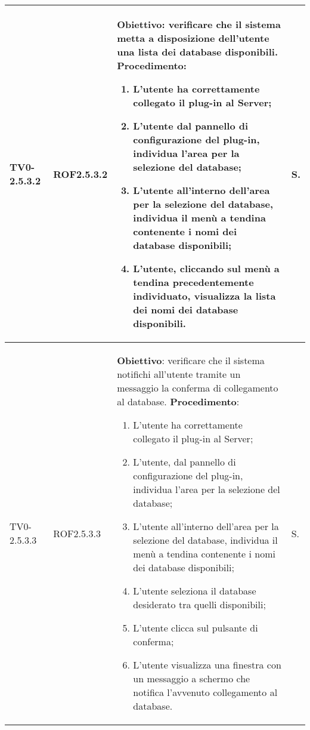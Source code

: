 \begin{longtable}{|C{.15\textwidth}|C{.13\textwidth}|m{.65\textwidth}|C{.08\textwidth}|}
TV0-2.5.3.2 & ROF2.5.3.2 &
	\textbf{Obiettivo}: verificare che il sistema metta a disposizione dell'utente una lista dei database disponibili. \newline
	\textbf{Procedimento}:
	\begin{enumerate}
		\item L'utente ha correttamente collegato il plug-in al Server;
		\item L'utente dal pannello di configurazione del plug-in, individua l'area per la selezione del database;
		\item L'utente all'interno dell'area per la selezione del database, individua il menù a tendina contenente i nomi dei database disponibili;
		\item L'utente, cliccando sul menù a tendina precedentemente individuato, visualizza la lista dei nomi dei database disponibili.
		\end{enumerate} & S. \\
\hline

TV0-2.5.3.3 & ROF2.5.3.3 &
	\textbf{Obiettivo}: verificare che il sistema notifichi all'utente tramite un messaggio la conferma di collegamento al database. \newline
	\textbf{Procedimento}:
	\begin{enumerate}
		\item L'utente ha correttamente collegato il plug-in al Server;
		\item L'utente, dal pannello di configurazione del plug-in, individua l'area per la selezione del database;
		\item L'utente all'interno dell'area per la selezione del database, individua il menù a tendina contenente i nomi dei database disponibili;
		\item L'utente seleziona il database desiderato tra quelli disponibili;
		\item L'utente clicca sul pulsante di conferma;
		\item L'utente visualizza una finestra con un messaggio a schermo che notifica l'avvenuto collegamento al database.		
			\end{enumerate} & S. \\
\hline


\end{longtable}
